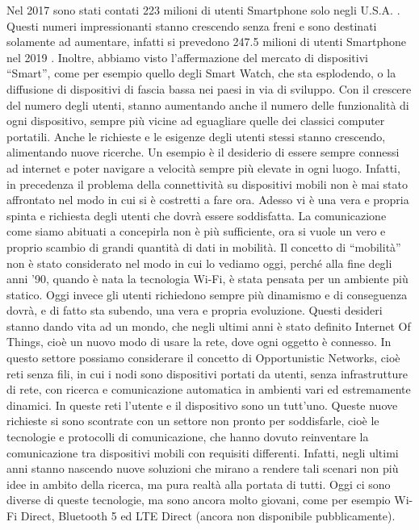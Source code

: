 Nel 2017 sono stati contati  223 milioni di utenti Smartphone solo negli U.S.A.
\cite{statista:1}. Questi numeri impressionanti stanno crescendo senza freni e sono destinati
solamente ad aumentare, infatti si prevedono
247.5 milioni di utenti Smartphone nel 2019 \cite{statista:1}.
Inoltre, abbiamo visto l'affermazione del mercato di dispositivi “Smart”, come per esempio
quello degli Smart Watch, che sta esplodendo, o la
diffusione di dispositivi di fascia bassa nei paesi in via di sviluppo.
Con il crescere del numero degli utenti, stanno aumentando anche il numero delle
funzionalità di ogni dispositivo, sempre più vicine ad eguagliare quelle dei classici
computer portatili. Anche le richieste e le esigenze degli utenti stessi stanno crescendo,
alimentando nuove ricerche. Un esempio è il desiderio di essere sempre connessi
ad internet e poter navigare a velocità sempre più elevate in ogni luogo. Infatti, in
precedenza il problema della connettività su dispositivi mobili non è mai stato affrontato
nel modo in cui si è costretti a fare ora. Adesso vi è una vera e propria spinta
e richiesta degli utenti che dovrà essere soddisfatta. La comunicazione come siamo
abituati a concepirla non è più sufficiente, ora si vuole un vero e proprio scambio di
grandi quantità di dati in mobilità. Il concetto di “mobilità” non è stato considerato
nel modo in cui lo vediamo oggi, perché alla fine degli anni ’90, quando è nata la
tecnologia Wi-Fi, è stata pensata per un ambiente più statico. Oggi invece gli utenti
richiedono sempre più dinamismo e di conseguenza dovrà, e di fatto sta subendo,
una vera e propria evoluzione.
Questi desideri stanno dando vita ad un mondo, che negli ultimi anni è stato
definito Internet Of Things, cioè un nuovo modo di usare la rete, dove ogni oggetto
è connesso. In questo settore possiamo considerare il concetto di Opportunistic
Networks, cioè reti senza fili, in cui i nodi sono dispositivi portati da utenti, senza
infrastrutture di rete, con ricerca e comunicazione automatica in ambienti vari ed
estremamente dinamici. In queste reti l’utente e il dispositivo sono un tutt’uno.
Queste nuove richieste si sono scontrate con un settore non pronto per soddisfarle,
cioè le tecnologie e protocolli di comunicazione, che hanno dovuto reinventare la
comunicazione tra dispositivi mobili con requisiti differenti. Infatti, negli ultimi anni
stanno nascendo nuove soluzioni che mirano a rendere tali scenari non più idee in
ambito della ricerca, ma pura realtà alla portata di tutti. Oggi ci sono diverse di
queste tecnologie, ma sono ancora molto giovani, come per esempio Wi-Fi Direct,
Bluetooth 5 ed LTE Direct (ancora non disponibile pubblicamente).


